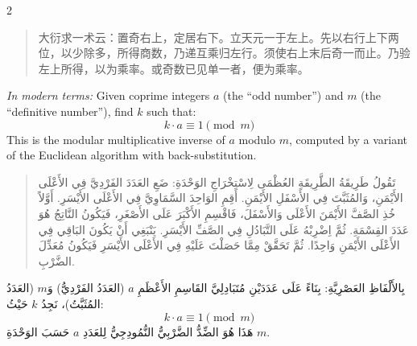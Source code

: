 \documentclass[11pt,a4paper]{article}
\newcommand{\ar}[1]{\arabicfont\beginR #1\endR}
\newcommand{\zhtext}[1]{{\chinese #1}}
\newenvironment{bilingual}{%
  \begin{paracol}{2}
}{%
  \end{paracol}
}
\begin{document}
\begin{bilingual}

\begin{leftcolumn*}
\begin{quote}
\zhtext{大衍求一术云：置奇右上，定居右下。立天元一于左上。先以右行上下两位，以少除多，所得商数，乃递互乘归左行。须使右上末后奇一而止。乃验左上所得，以为乘率。或奇数已见单一者，便为乘率。}
\end{quote}

\textit{In modern terms:} Given coprime integers $a$ (the ``odd number'') and $m$ (the ``definitive number''), find $k$ such that:
\[k \cdot a \equiv 1 \pmod{m}\]
This is the modular multiplicative inverse of $a$ modulo $m$, computed by a variant of the Euclidean algorithm with back-substitution.
\end{leftcolumn*}

\begin{rightcolumn*}
\begin{quote}
\ar{تَقُولُ طَرِيقَةُ الطَّرِيقَةِ العُظْمَى لِاسْتِخْرَاجِ الوَحْدَةِ: ضَعِ العَدَدَ الفَرْدِيَّ فِي الأَعْلَى الأَيْمَنِ، وَالمُثَبَّتَ فِي الأَسْفَلِ الأَيْمَنِ. أَقِمِ الوَاحِدَ السَّمَاوِيَّ فِي الأَعْلَى الأَيْسَرِ. أَوَّلاً خُذِ الصَّفَّ الأَيْمَنَ الأَعْلَى وَالأَسْفَلَ، فَاقْسِمِ الأَكْبَرَ عَلَى الأَصْغَرِ، فَيَكُونُ النَّاتِجُ هُوَ عَدَدَ القِسْمَةِ. ثُمَّ اِضْرِبْهُ عَلَى التَّبَادُلِ فِي الصَّفِّ الأَيْسَرِ. يَنْبَغِي أَنْ يَكُونَ البَاقِي فِي الأَعْلَى الأَيْمَنِ وَاحِدًا. ثُمَّ تَحَقَّقْ مِمَّا حَصَلْتَ عَلَيْهِ فِي الأَعْلَى الأَيْسَرِ فَيَكُونُ مُعَدِّلَ الضَّرْبِ.}
\end{quote}

\ar{بِالأَلْفَاظِ العَصْرِيَّةِ: بِنَاءً عَلَى عَدَدَيْنِ مُتَبَادِلِيَّ القَاسِمِ الأَعْظَمِ $a$ (العَدَدُ الفَرْدِيُّ) وَ$m$ (العَدَدُ المُثَبَّتُ)، نَجِدُ $k$ حَيْثُ:}
\[k \cdot a \equiv 1 \pmod{m}\]
\ar{هَذَا هُوَ الضِّدُّ الضَّرْبِيُّ النُّمُودِجِيُّ لِلعَدَدِ $a$ حَسَبَ الوَحْدَةِ $m$.}
\end{rightcolumn*}

\end{bilingual}

\vspace{1em}
\end{document}

